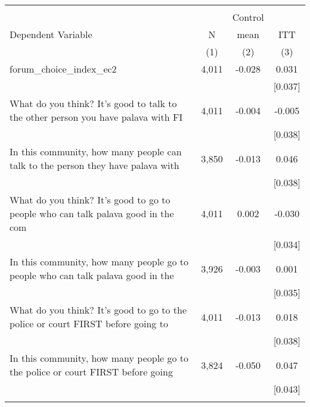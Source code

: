 \begin{tabular}{lccc}
\hline \noalign{\smallskip} &  &  & \\
 &  & Control & \\
Dependent Variable & N & mean & ITT\\
 & (1) & (2) & (3)\\
\noalign{\smallskip}\hline \noalign{\smallskip}forum_choice_index_ec2 & 4,011 & -0.028 & 0.031\\
 &  &  & [0.037]\\
What do you think? It's good to talk to the other person you have palava with FI & 4,011 & -0.004 & -0.005\\
 &  &  & [0.038]\\
In this community, how many people can talk to the person they have palava with  & 3,850 & -0.013 & 0.046\\
 &  &  & [0.038]\\
What do you think? It's good to go to people who can talk palava good in the com & 4,011 & 0.002 & -0.030\\
 &  &  & [0.034]\\
In this community, how many people go to people who can talk palava good in the  & 3,926 & -0.003 & 0.001\\
 &  &  & [0.035]\\
What do you think? It's good to go to the police or court FIRST before going to  & 4,011 & -0.013 & 0.018\\
 &  &  & [0.038]\\
In this community, how many people go to the police or court FIRST before going  & 3,824 & -0.050 & 0.047\\
 &  &  & [0.043]\\
\noalign{\smallskip}\hline\end{tabular}
